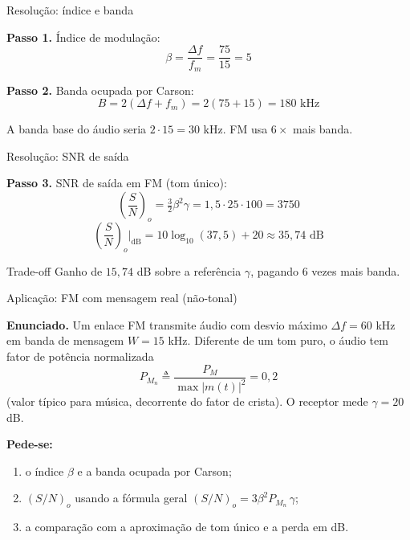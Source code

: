 
\begin{frame}{Resolução: índice e banda}

\textbf{Passo 1.} Índice de modulação:
\[
\beta = \frac{\Delta f}{f_m} = \frac{75}{15} = 5
\]

\textbf{Passo 2.} Banda ocupada por Carson:
\[
B = 2(\Delta f + f_m) = 2(75 + 15) = 180 \text{ kHz}
\]

A banda base do áudio seria $2 \cdot 15 = 30$ kHz. FM usa $6\times$ mais banda.

\end{frame}


\begin{frame}{Resolução: SNR de saída}

\textbf{Passo 3.} SNR de saída em FM (tom único):
\[
\left(\frac{S}{N}\right)_o = \tfrac{3}{2}\beta^2 \gamma = 1{,}5 \cdot 25 \cdot 100 = 3750
\]
\[
\left(\frac{S}{N}\right)_o\Big|_{\text{dB}} = 10\log_{10}(37{,}5) + 20 \approx 35{,}74 \text{ dB}
\]

\begin{block}{Trade-off}
Ganho de $15{,}74$ dB sobre a referência $\gamma$, pagando $6$ vezes mais banda.
\end{block}

\end{frame}


\begin{frame}{Aplicação: FM com mensagem real (não-tonal)}

\textbf{Enunciado.} Um enlace FM transmite áudio com desvio máximo $\Delta f = 60$ kHz em banda de mensagem $W = 15$ kHz. Diferente de um tom puro, o áudio tem fator de potência normalizada
\[
P_{M_n} \triangleq \frac{P_M}{\max|m(t)|^2} = 0{,}2
\]
(valor típico para música, decorrente do fator de crista). O receptor mede $\gamma = 20$ dB.

\textbf{Pede-se:}
\begin{enumerate}
\item[(a)] o índice $\beta$ e a banda ocupada por Carson;
\item[(b)] $(S/N)_o$ usando a fórmula geral $(S/N)_o = 3\beta^2 P_{M_n}\, \gamma$;
\item[(c)] a comparação com a aproximação de tom único e a perda em dB.
\end{enumerate}

\end{frame}

